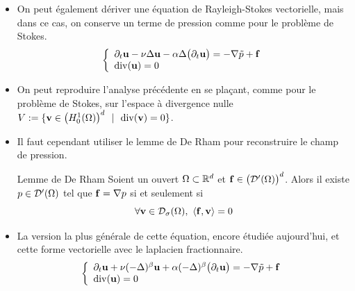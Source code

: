 \begin{frame}
    \begin{itemize}
        \item On peut également dériver une équation de Rayleigh-Stokes vectorielle, mais dans ce cas, on conserve un terme de pression comme pour le problème de Stokes.
        \begin{equation*}
            \left\{\begin{array}{l}
                \partial_t\bm{\mathrm{u}} - \nu\Delta \bm{\mathrm{u}} - \alpha\Delta \big(\partial_t \bm{\mathrm{u}}\big) = -\nabla \tilde{p} + \bm{\mathrm{f}}  \\
                \mathrm{div} (\bm{\mathrm{u}}) = 0
            \end{array}\right.
        \end{equation*}
        \item On peut reproduire l'analyse précédente en se plaçant, comme pour le problème de Stokes, sur l'espace à divergence nulle $V := \{\bfm{v} \in \big(\Hone\big)^d \ \ | \ \ \Div(\bfm{v}) = 0\}$.
        \item Il faut cependant utiliser le lemme de De Rham pour reconstruire le champ de pression.
        \begin{block}{Lemme de De Rham}
    Soient un ouvert $\Omega \subset \mathbb{R}^d$ et $\bm{\mathrm{f}} \in \big(\mathcal{D}'(\Omega)\big)^d$. Alors il existe 
    $p \in \mathcal{D}'(\Omega)$ tel que $\bm{\mathrm{f}} = \nabla p$ si et seulement si 
    \begin{equation*}
        \forall \bm{\mathrm{v}} \in \mathcal{D}_{\sigma}(\Omega), \ \langle \bm{\mathrm{f}}, \bm{\mathrm{v}} \rangle =0
    \end{equation*}
\end{block}
\item La version la plus générale de cette équation, encore étudiée aujourd'hui, et cette forme vectorielle avec le laplacien fractionnaire.
\begin{equation*}
            \left\{\begin{array}{l}
                \partial_t\bm{\mathrm{u}} + \nu(-\Delta)^{\beta} \bm{\mathrm{u}} + \alpha(-\Delta)^{\beta} \big(\partial_t \bm{\mathrm{u}}\big) = -\nabla \tilde{p} + \bm{\mathrm{f}}  \\
                \mathrm{div} (\bm{\mathrm{u}}) = 0
            \end{array}\right.
        \end{equation*}
    \end{itemize}
\end{frame}

